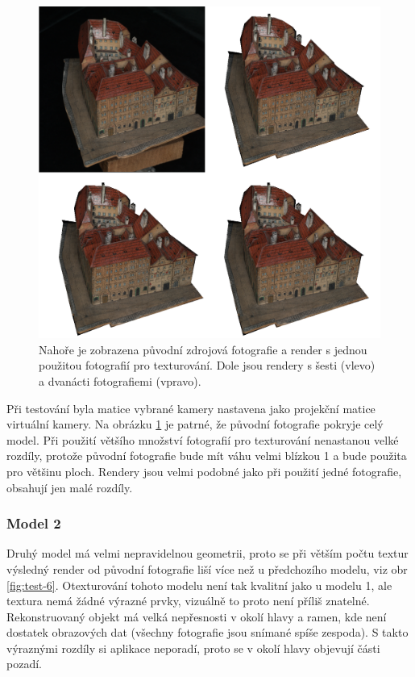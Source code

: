 \documentclass[11pt,twoside,a4paper]{book}
\begin{document}
\begin{figure}[h!]
\begin{center}
\includegraphics[width=\textwidth]{figures/test-7}
\caption{Nahoře je zobrazena původní zdrojová fotografie a render s jednou použitou fotografií pro texturování. Dole jsou rendery s šesti (vlevo) a dvanácti fotografiemi (vpravo).}
\label{fig:test-7}
\end{center}
\end{figure}

Při testování byla matice vybrané kamery nastavena jako projekční matice virtuální kamery. Na obrázku \ref{fig:test-7} je patrné, že původní fotografie pokryje celý model. Při použití většího množství fotografií pro texturování nenastanou velké rozdíly, protože původní fotografie bude mít váhu velmi blízkou 1 a bude použita pro většinu ploch. Rendery jsou velmi podobné jako při použití jedné fotografie, obsahují jen malé rozdíly.

\subsubsection*{Model 2}

Druhý model má velmi nepravidelnou geometrii, proto se při větším počtu textur výsledný render od původní fotografie liší více než u předchozího modelu, viz obr \ref{fig:test-6}. Otexturování tohoto modelu není tak kvalitní jako u modelu 1, ale textura nemá žádné výrazné prvky, vizuálně to proto není příliš znatelné. Rekonstruovaný objekt má velká nepřesnosti v okolí hlavy a ramen, kde není dostatek obrazových dat (všechny fotografie jsou snímané spíše zespoda). S takto výraznými rozdíly si aplikace neporadí, proto se v okolí hlavy objevují části pozadí.
\end{document}
